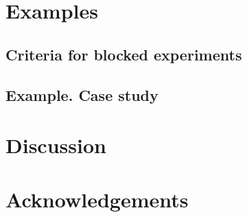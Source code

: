 \documentclass[11pt]{article}
\begin{document}
\section{Examples}
\label{sec::examples}


\subsection{Criteria for blocked experiments}
\label{subsec::compound_blocked}


\subsection{Example. Case study}
\label{subsec::case_study}



\section{Discussion}
\label{sec::discussion}

\section{Acknowledgements}

\cleardoublepage
{}
{} 
%


\end{document}
